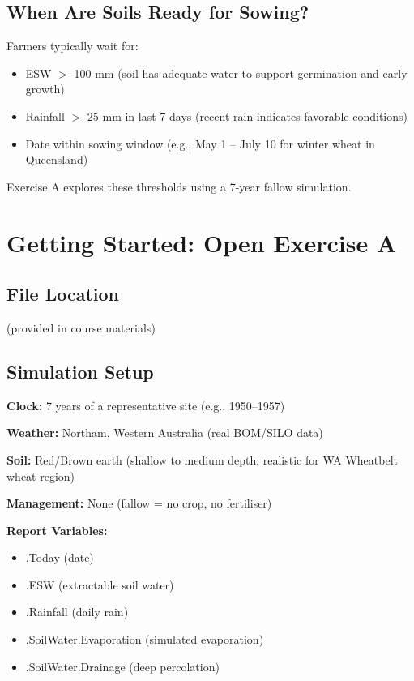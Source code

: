\subsection{When Are Soils Ready for Sowing?}

Farmers typically wait for:
\begin{itemize}
  \item ESW $>$ 100 mm (soil has adequate water to support germination and early growth)
  \item Rainfall $>$ 25 mm in last 7 days (recent rain indicates favorable conditions)
  \item Date within sowing window (e.g., May 1 – July 10 for winter wheat in Queensland)
\end{itemize}

Exercise A explores these thresholds using a 7-year fallow simulation.

\section{Getting Started: Open Exercise A}

\subsection{File Location}

 (provided in course materials)

\subsection{Simulation Setup}

\textbf{Clock:} 7 years of a representative site (e.g., 1950–1957)

\textbf{Weather:} Northam, Western Australia (real BOM/SILO data)

\textbf{Soil:} Red/Brown earth (shallow to medium depth; realistic for WA Wheatbelt wheat region)

\textbf{Management:} None (fallow = no crop, no fertiliser)

\textbf{Report Variables:} 
\begin{itemize}
  \item [Clock].Today (date)
  \item [Soil].ESW (extractable soil water)
  \item [Weather].Rainfall (daily rain)
  \item [Soil].SoilWater.Evaporation (simulated evaporation)
  \item [Soil].SoilWater.Drainage (deep percolation)
\end{itemize}

